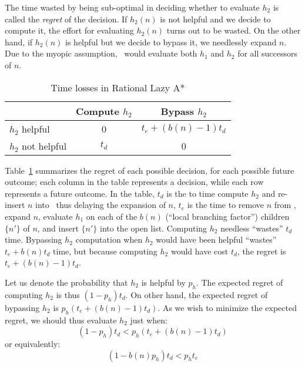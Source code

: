 The time wasted by being sub-optimal in deciding whether to evaluate
$h_2$ is called the {\em regret} of the decision. If $h_2(n)$ is not
helpful and we decide to compute it, the effort for evaluating
$h_2(n)$ turns out to be wasted. On the other hand, if $h_2(n)$ is
helpful but we decide to bypass it, we needlessly expand $n$. Due to
the myopic assumption, \rationallazyastar~would evaluate both $h_1$
and $h_2$ for all successors of $n$.

\begin{table}[h!]
\begin{center}
\begin{tabular}{|l|c|c|}
\hline
               & Compute $h_2$ & Bypass $h_2$\\
\hline
$h_2$ helpful &   0            & $t_e+(b(n)-1)t_d$\\
\hline
$h_2$ not helpful & $t_d$      & 0 \\
\hline
\end{tabular}
\end{center}
\caption{Time losses in Rational Lazy A*}
\label{tbl:rla-rational-lazy-a-time}
\end{table}

Table~\ref{tbl:rla-rational-lazy-a-time}
summarizes the regret of each possible decision, for each possible future
outcome; each column in the table represents a decision, while each row
represents a future outcome.
In the table, $t_d$ is the to time compute $h_2$ and re-insert $n$ into
\OPEN~thus delaying the expansion of $n$, $t_e$ is the time to remove $n$ from \OPEN,
expand $n$, evaluate $h_1$ on each of the $b(n)$ (``local branching factor'')
children $\{n'\}$ of $n$, and insert $\{n'\}$ into the open list.
Computing $h_2$ needless ``wastes'' $t_d$ time.
Bypassing $h_2$ computation when $h_2$ would have been helpful ``wastes''
$t_e+b(n)t_d$ time, but because computing $h_2$ would have cost $t_d$, the
regret is $t_e+(b(n)-1)t_d$.

Let us denote the probability that $h_2$ is helpful by
$p_h$. The expected regret of computing $h_2$ is thus $(1-p_h) t_d$.
On other hand, the expected regret of bypassing $h_2$ is $p_h(
t_e+(b(n)-1)t_d)$. As we wish to minimize the expected regret, we should thus evaluate $h_2$ just when:
\begin{equation}
(1-p_h) t_d < p_h (t_e+(b(n)-1)t_d)
\end{equation}
or equivalently:
\begin{equation}
(1-b(n) p_h) t_d < p_h t_e
\end{equation}


